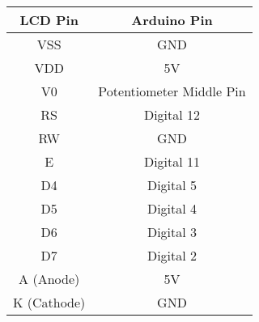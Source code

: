 \begin{tabular}{|c|c|}
    \hline
    \textbf{LCD Pin} & \textbf{Arduino Pin} \\
    \hline
    VSS & GND \\
    \hline
    VDD & 5V \\
    \hline
    V0 & Potentiometer Middle Pin \\
    \hline
    RS & Digital 12 \\
    \hline
    RW & GND \\
    \hline
    E & Digital 11 \\
    \hline
    D4 & Digital 5 \\
    \hline
    D5 & Digital 4 \\
    \hline
    D6 & Digital 3 \\
    \hline
    D7 & Digital 2 \\
    \hline
    A (Anode) & 5V \\
    \hline
    K (Cathode) & GND \\
    \hline
\end{tabular}
